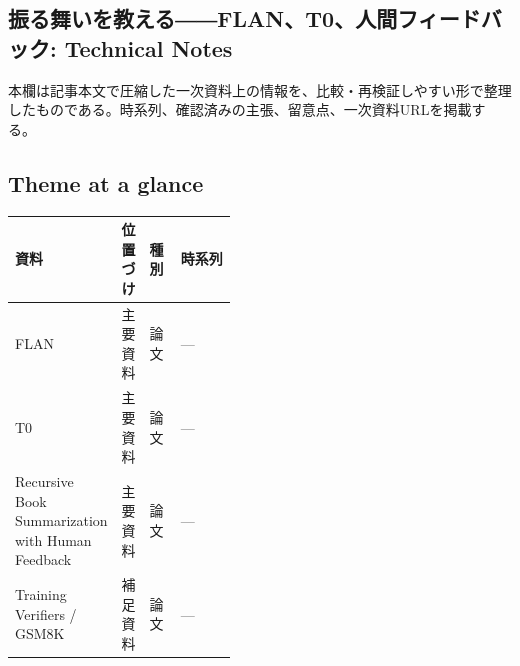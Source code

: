 \subsection*{振る舞いを教える――FLAN、T0、人間フィードバック: Technical Notes}
本欄は記事本文で圧縮した一次資料上の情報を、比較・再検証しやすい形で整理したものである。時系列、確認済みの主張、留意点、一次資料URLを掲載する。
\medskip
\subsection*{Theme at a glance}
\begin{center}
\footnotesize
\begin{tabularx}{\linewidth}{@{}p{0.20\linewidth}p{0.10\linewidth}p{0.14\linewidth}X@{}}
\toprule
資料 & 位置づけ & 種別 & 時系列 \\
\midrule
FLAN & 主要資料 & 論文 & — \\
T0 & 主要資料 & 論文 & — \\
Recursive Book Summarization with Human Feedback & 主要資料 & 論文 & — \\
Training Verifiers / GSM8K & 補足資料 & 論文 & — \\
\bottomrule
\end{tabularx}
\end{center}
\normalsize

